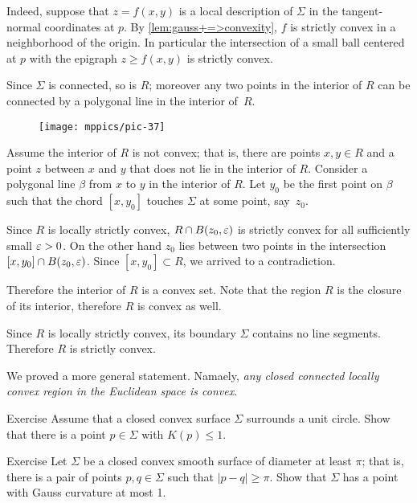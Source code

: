 Indeed, suppose that $z=f(x,y)$ is a local description of $\Sigma$ in the tangent-normal coordinates at $p$.
By \ref{lem:gauss+=>convexity}, $f$ is strictly convex in a neighborhood of the origin.
In particular the intersection of a small ball centered at $p$ with the epigraph $z\ge f(x,y)$ is strictly convex.

Since $\Sigma$ is connected, so is $R$;
moreover any two points in the interior of $R$ can be connected by a polygonal line in the interior of~$R$.

\begin{wrapfigure}{o}{43 mm}
\vskip-0mm
\centering
\texttt{[image: mppics/pic-37]}
\vskip-0mm
\end{wrapfigure}

Assume the interior of $R$ is not convex; that is, there are points $x,y\in R$ and a point $z$ between $x$ and $y$ that does not lie in the interior of $R$.
Consider a polygonal  line $\beta$ from $x$ to $y$ in the interior of $R$.
Let $y_0$ be the first point on $\beta$ such that the chord $[x,y_0]$ touches $\Sigma$ at some point, say~$z_0$.

Since $R$ is locally strictly convex, $R\z\cap B(z_0,\eps)$ is strictly convex for all sufficiently small $\varepsilon>0$.
On the other hand $z_0$ lies between two points in the intersection $[x,y_0]\cap B(z_0,\varepsilon)$.
Since $[x,y_0]\subset R$, we arrived to a contradiction.

Therefore the interior of $R$ is a convex set.
Note that the region $R$ is the closure of its interior, therefore $R$ is convex as well.

Since $R$ is locally strictly convex, its boundary $\Sigma$ contains no line segments.
Therefore $R$ is strictly convex.
\qeds

We proved a more general statement.
Namaely, {}\emph{any closed connected locally convex region in the Euclidean space is convex}.

\begin{thm}{Exercise}\label{ex:surrounds-disc}
Assume that a closed convex surface $\Sigma$ surrounds a unit circle.
Show that there is a point  $p \in \Sigma$ with $K(p)\leq 1$. 
\end{thm} 

\begin{thm}{Exercise}\label{ex:small-gauss}
Let $\Sigma$ be a closed convex smooth surface of diameter at least $\pi$;
that is, there is a pair of points $p,q\in\Sigma$ such that $|p-q|\ge \pi$.
Show that $\Sigma$ has a point with Gauss curvature at most 1.
\end{thm}

